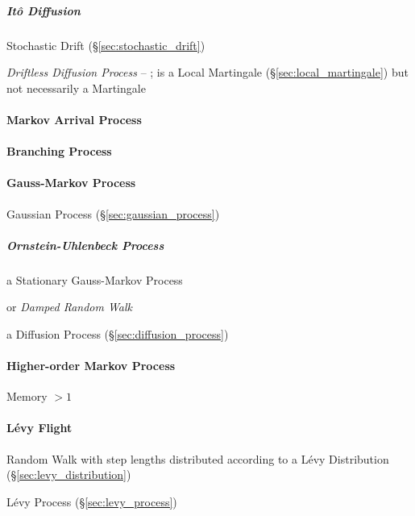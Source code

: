 \subparagraph{It\^o Diffusion}\label{sec:ito_diffusion}\hfill

Stochastic Drift (\S\ref{sec:stochastic_drift})

\emph{Driftless Diffusion Process} -- ; is a Local Martingale
(\S\ref{sec:local_martingale}) but not necessarily a Martingale



\paragraph{Markov Arrival Process}\label{sec:markov_arrival_process}\hfill

\paragraph{Branching Process}\label{sec:branching_process}\hfill

\paragraph{Gauss-Markov Process}\label{sec:gauss_markov_process}\hfill

Gaussian Process (\S\ref{sec:gaussian_process})



\subparagraph{Ornstein-Uhlenbeck Process}\label{sec:ornstein_uhlenbeck}\hfill

a Stationary Gauss-Markov Process

or \emph{Damped Random Walk}

a Diffusion Process (\S\ref{sec:diffusion_process})



\paragraph{Higher-order Markov Process}\label{sec:higher_order_markov}\hfill

Memory $>1$



\paragraph{L\'evy Flight}\label{sec:levy_flight}\hfill

Random Walk with step lengths distributed according to a L\'evy Distribution
(\S\ref{sec:levy_distribution})

\fist L\'evy Process (\S\ref{sec:levy_process})



